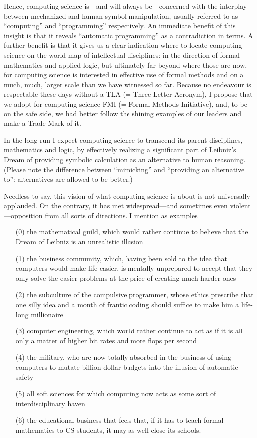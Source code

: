 \documentclass[a4paper,12pt]{article}
\begin{document}
Hence, computing science is---and will always be---concerned with the
interplay between mechanized and human symbol manipulation, usually
referred to as ``computing'' and ``programming'' respectively.  An
immediate benefit of this insight is that it reveals ``automatic
programming'' as a contradiction in terms.  A further benefit is that it
gives us a clear indication where to locate computing science on the
world map of intellectual disciplines: in the direction of formal
mathematics and applied logic, but ultimately far beyond where those are
now, for computing science is interested in effective use of formal
methods and on a much, much, larger scale than we have witnessed so far.
Because no endeavour is respectable these days without a TLA (=
Three-Letter Acronym), I propose that we adopt for computing science FMI
(= Formal Methods Initiative), and, to be on the safe side, we had
better follow the shining examples of our leaders and make a Trade Mark
of it.

In the long run I expect computing science to transcend its parent
disciplines, mathematics and logic, by effectively realizing a
significant part of Leibniz's Dream of providing symbolic calculation as
an alternative to human reasoning.  (Please note the difference between
``mimicking'' and ``providing an alternative to'': alternatives are
allowed to be better.)

Needless to say, this vision of what computing science is about is not
universally applauded.  On the contrary, it has met widespread---and
sometimes even violent---opposition from all sorts of directions.  I
mention as examples


\begin{enumerate}
\item[(0)] the mathematical guild, which would rather continue to
  believe that the Dream of Leibniz is an unrealistic illusion
\item[(1)] the business community, which, having been sold to the idea
  that computers would make life easier, is mentally unprepared to
  accept that they only solve the easier problems at the price of
  creating much harder ones
\item[(2)] the subculture of the compulsive programmer, whose ethics
  prescribe that one silly idea and a month of frantic coding should
  suffice to make him a life-long millionaire
\item[(3)] computer engineering, which would rather continue to act as
  if it is all only a matter of higher bit rates and more flops per
  second
\item[(4)] the military, who are now totally absorbed in the business of
  using computers to mutate billion-dollar budgets into the illusion of
  automatic safety
\item[(5)] all soft sciences for which computing now acts as some sort
  of interdisciplinary haven
\item[(6)] the educational business that feels that, if it has to teach
  formal mathematics to CS students, it may as well close its schools.
\end{enumerate}
\end{document}
